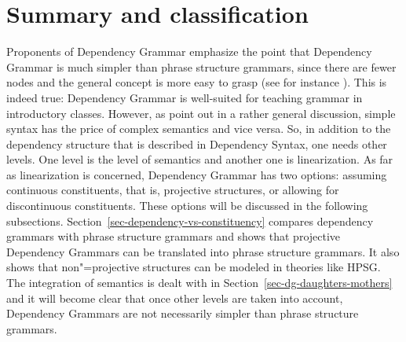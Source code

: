 



\section{Summary and classification}




Proponents of Dependency Grammar emphasize the point that Dependency Grammar is much simpler than
phrase structure grammars, since there are fewer nodes and the general concept is more easy to
grasp (see for instance \citealp[Section~3.2, Section~7]{Osborne2014a-u}). This is indeed true: Dependency Grammar is well-suited for teaching grammar in
introductory classes. However, as \citet[]{SR2012a} point out in a rather general
discussion, simple syntax has the price of complex semantics and vice versa. So, in addition to
the dependency structure that is described in Dependency Syntax, one needs other levels. One level
is the level of semantics and another one is linearization. As far as linearization is concerned,
Dependency Grammar has two options: assuming continuous constituents, that is, projective structures,
or allowing for discontinuous constituents. These options will be discussed in the following subsections.
Section~\ref{sec-dependency-vs-constituency} compares dependency grammars with phrase structure
grammars and shows that projective Dependency Grammars can be translated into phrase structure
grammars. It also shows that non"=projective structures can be modeled in theories like HPSG.
The integration of semantics is dealt with in Section~\ref{sec-dg-daughters-mothers} and it will become clear that once other
levels are taken into account, Dependency Grammars are not necessarily simpler than phrase structure grammars.


